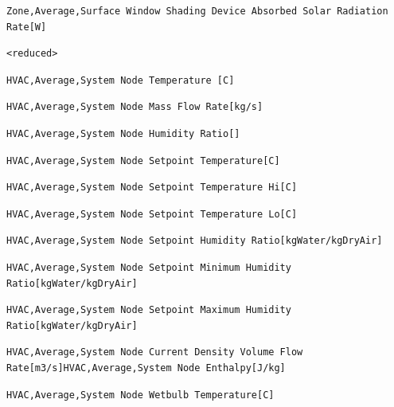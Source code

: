 \begin{lstlisting}
Zone,Average,Surface Window Shading Device Absorbed Solar Radiation Rate[W]
\end{lstlisting}

\begin{lstlisting}
<reduced>
\end{lstlisting}

\begin{lstlisting}
HVAC,Average,System Node Temperature [C]
\end{lstlisting}

\begin{lstlisting}
HVAC,Average,System Node Mass Flow Rate[kg/s]
\end{lstlisting}

\begin{lstlisting}
HVAC,Average,System Node Humidity Ratio[]
\end{lstlisting}

\begin{lstlisting}
HVAC,Average,System Node Setpoint Temperature[C]
\end{lstlisting}

\begin{lstlisting}
HVAC,Average,System Node Setpoint Temperature Hi[C]
\end{lstlisting}

\begin{lstlisting}
HVAC,Average,System Node Setpoint Temperature Lo[C]
\end{lstlisting}

\begin{lstlisting}
HVAC,Average,System Node Setpoint Humidity Ratio[kgWater/kgDryAir]
\end{lstlisting}

\begin{lstlisting}
HVAC,Average,System Node Setpoint Minimum Humidity Ratio[kgWater/kgDryAir]
\end{lstlisting}

\begin{lstlisting}
HVAC,Average,System Node Setpoint Maximum Humidity Ratio[kgWater/kgDryAir]
\end{lstlisting}

\begin{lstlisting}
HVAC,Average,System Node Current Density Volume Flow Rate[m3/s]HVAC,Average,System Node Enthalpy[J/kg]
\end{lstlisting}

\begin{lstlisting}
HVAC,Average,System Node Wetbulb Temperature[C]
\end{lstlisting}

